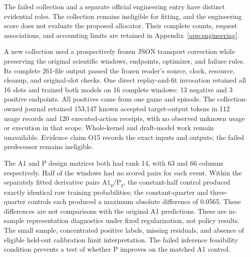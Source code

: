 \documentclass[11pt]{article}
\begin{document}
The failed collection and a separate official engineering entry have distinct evidential roles. The collection remains ineligible for fitting, and the engineering score does not evaluate the proposed allocator. Their complete counts, request associations, and accounting limits are retained in Appendix~\ref{app:engineering}.

A new collection used a prospectively frozen JSON transport correction while preserving the original scientific windows, endpoints, optimizer, and failure rules. Its complete 261-file output passed the frozen reader's source, clock, resource, cleanup, and original-slot checks. One direct replay-and-fit invocation retained all 16 slots and trained both models on 16 complete windows: 13 negative and 3 positive endpoints. All positives came from one game and episode. The collection-owned journal retained 153,147 known accepted target-output tokens in 112 usage records and 120 executed-action receipts, with no observed unknown usage or execution in that scope. Whole-kernel and draft-model work remain unavailable. Evidence claim O15 records the exact inputs and outputs; the failed predecessor remains ineligible.

The A1 and P design matrices both had rank 14, with 63 and 66 columns respectively. Half of the windows had no scored pairs for each event. Within the separately fitted derivative pairs $\mathrm{A1}_q/\mathrm{P}_q$, the constant-half control produced exactly identical raw training probabilities; the constant-quarter and three-quarter controls each produced a maximum absolute difference of 0.0565. These differences are not comparisons with the original A1 predictions. These are in-sample representation diagnostics under fixed regularization, not policy results. The small sample, concentrated positive labels, missing residuals, and absence of eligible held-out calibration limit interpretation. The failed inference feasibility condition prevents a test of whether P improves on the matched A1 control.
\end{document}
